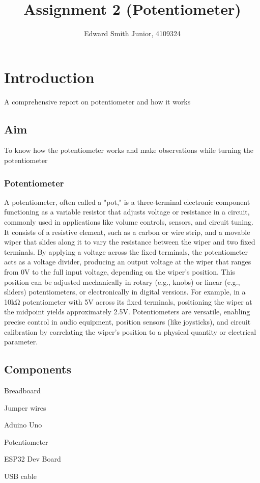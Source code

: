 \documentclass{article}
\title{Assignment 2 (Potentiometer)}
\author{Edward Smith Junior, 4109324}
\begin{document}
\maketitle


\section{Introduction}

A comprehensive report on potentiometer and how it works

\subsection{Aim}

To know how the potentiometer works and make observations while turning the potentiometer

\subsubsection{Potentiometer}
A potentiometer, often called a "pot," is a three-terminal electronic component functioning as a variable resistor that adjusts voltage or resistance in a circuit, commonly used in applications like volume controls, sensors, and circuit tuning. It consists of a resistive element, such as a carbon or wire strip, and a movable wiper that slides along it to vary the resistance between the wiper and two fixed terminals. By applying a voltage across the fixed terminals, the potentiometer acts as a voltage divider, producing an output voltage at the wiper that ranges from 0V to the full input voltage, depending on the wiper’s position. This position can be adjusted mechanically in rotary (e.g., knobs) or linear (e.g., sliders) potentiometers, or electronically in digital versions. For example, in a 10kΩ potentiometer with 5V across its fixed terminals, positioning the wiper at the midpoint yields approximately 2.5V. Potentiometers are versatile, enabling precise control in audio equipment, position sensors (like joysticks), and circuit calibration by correlating the wiper’s position to a physical quantity or electrical parameter.
\subsection{Components}

 \item  Breadboard
 \item  Jumper wires
 \item  Aduino Uno
 \item  Potentiometer
 \item  ESP32 Dev Board
 \item  USB cable
\end{document}
